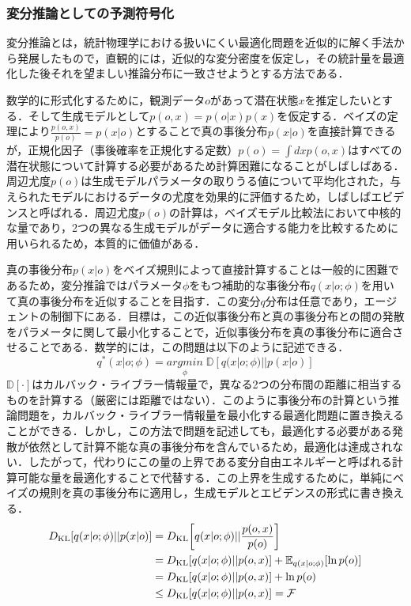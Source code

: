 \documentclass[a4paper, titlepage]{jsarticle}
\begin{document}
\subsubsection{変分推論としての予測符号化}
変分推論とは，統計物理学における扱いにくい最適化問題を近似的に解く手法から発展したもので，直観的には，近似的な変分密度を仮定し，その統計量を最適化した後それを望ましい推論分布に一致させようとする方法である．
\par
数学的に形式化するために，観測データ$o$があって潜在状態$x$を推定したいとする．そして生成モデルとして\;$p(o,x)=p(o|x)p(x)$\;を仮定する．ベイズの定理により\;$\displaystyle\frac{p(o,x)}{p(o)}=p(x|o)$\;とすることで真の事後分布$p(x|o)$を直接計算できるが，正規化因子（事後確率を正規化する定数）\;$p(o)=\int dxp(o,x)$\;はすべての潜在状態について計算する必要があるため計算困難になることがしばしばある．周辺尤度$p(o)$は生成モデルパラメータの取りうる値について平均化された，与えられたモデルにおけるデータの尤度を効果的に評価するため，しばしばエビデンスと呼ばれる．周辺尤度$p(o)$の計算は，ベイズモデル比較法において中核的な量であり，2つの異なる生成モデルがデータに適合する能力を比較するために用いられるため，本質的に価値がある．
\par
真の事後分布$p(x|o)$をベイズ規則によって直接計算することは一般的に困難であるため，変分推論ではパラメータ$\phi$をもつ補助的な事後分布$q(x|o;\phi)$を用いて真の事後分布を近似することを目指す．この変分$q$分布は任意であり，エージェントの制御下にある．目標は，この近似事後分布と真の事後分布との間の発散をパラメータに関して最小化することで，近似事後分布を真の事後分布に適合させることである．数学的には，この問題は以下のように記述できる．
\begin{equation}
   q^*(x|o;\phi)=\underset{\phi}{argmin}\;\mathbb{D}[q(x|o;\phi)||p(x|o)]
\end{equation}
$\mathbb{D}[\cdot]$はカルバック・ライブラー情報量で，異なる2つの分布間の距離に相当するものを計算する（厳密には距離ではない）．このように事後分布の計算という推論問題を，カルバック・ライブラー情報量を最小化する最適化問題に置き換えることができる．しかし，この方法で問題を記述しても，最適化する必要がある発散が依然として計算不能な真の事後分布を含んでいるため，最適化は達成されない．したがって，代わりにこの量の上界である変分自由エネルギーと呼ばれる計算可能な量を最適化することで代替する．この上界を生成するために，単純にベイズの規則を真の事後分布に適用し，生成モデルとエビデンスの形式に書き換える．
\begin{equation}
   \begin{aligned}
      D_{\mathrm{KL}}[q(x|o;\phi)||p(x|o)]&=D_{\mathrm{KL}}\qty[q(x|o;\phi)||\frac{p(o,x)}{p(o)}] \\
      &=D_{\mathrm{KL}}[q(x|o;\phi)||p(o,x)]+\mathbb{E}_{q(x|o;\phi)}[\ln p(o)] \\
      &=D_{\mathrm{KL}}[q(x|o;\phi)||p(o,x)]+\ln p(o) \\
      &\le D_{\mathrm{KL}}[q(x|o;\phi)||p(o,x)]=\mathcal{F}
   \end{aligned}
\end{equation}
\end{document}
